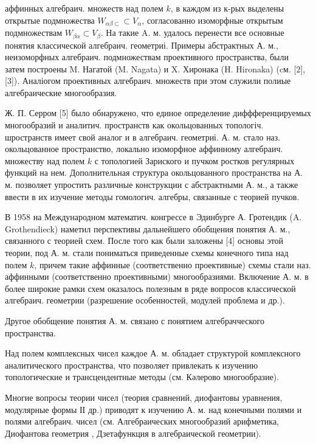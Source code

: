 \documentclass[10pt]{article}
\begin{document}
аффинных алгебраич. множеств над полем $k$, в каждом из к-рых выделены открытые подмножества $W_{\alpha \beta \subset} \subset V_{\alpha}$, согласованно изоморфные открытым подмножествам $W_{\beta \alpha} \subset V_{\beta}$. На такие A. м. удалось перенести все основные понятия классической алгебраич. геометриі. Примеры абстрактных А. м., неизоморфных алгебраич. подмножествам проективного пространства, были затем построены M. Нагатой (M. Nagata) и X. Хиронака (H. Hironaka) (cм. [2], [3]). Аналіогом проективных алгебраич. множеств при этом служили полиые алгебраические многообразия.



Ж. П. Серром [5] было обнаружено, что единое определение диффференцируемых многообразий и аналитич. пространств как окольцованных топологіч. шространств имеет свой аналог и в алгебраич. геометриі. А. м. стало наз. окольцованное пространство, локально изоморфное аффинному алгебраич. множеству над полем $k$ с топологией Зариского и пучком ростков регулярных функций на нем. Дополнительная структура окольцованного пространства на А. м. позволяет упростить различные конструкции с абстрактными А. м., а также ввести в их изучение методы гомологич. алгебры, связанные с теорией пучков.



В 1958 на Международном математич. конгрессе в Эдинбурге А. Гротендик (A. Grothendieck) наметил перспективы дальнейшего обобщения понятия А. м., связанного с теорией схем. После того как были заложены [4] основы этой теории, под А. м. стали пониматься приведенные схемы конечного типа над полем $k$, причем такие аффинные (соответственно проективные) схемы стали наз. аффинными (соответственно проективными) многообразиями. Включение А. м. в более широкие рамки схем оказалось полезным в ряде вопросов классической алгебраич. геометрии (разрешение особенностей, модулей проблема и др.).



Другое обобщение понятия А. м. связано с понятием алгебрачческого пространства.



Над полем комплексных чисел каждое А. м. обладает структурой комплексного аналитического пространства, что позволяет привлекать к изучению топологические и трансцендентные методы (см. Кәлерово многообразие).



Многие вопросы теории чисел (теория сравнений, диофантовы уравнения, модулярные формы ІІ др.) приводят к изучению А. м. над конечными полями и полями алгебраич. чисел (см. Алгебраических многообразий арифметика, Диофантова геометрия , Дзетафункция в алгебраической геометрии).
\end{document}
